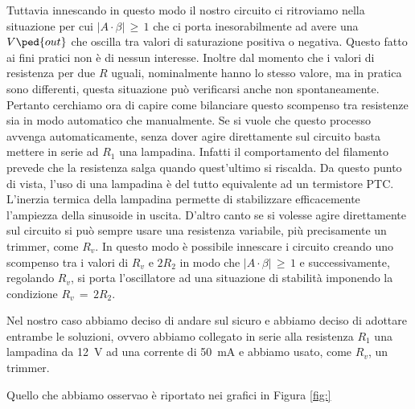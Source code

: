 Tuttavia innescando in questo modo il nostro circuito ci ritroviamo nella situazione per cui $\left|A \cdot \beta \right|\, \geq \,1$ che ci porta inesorabilmente ad avere una $V\ped{out}$ che oscilla tra valori di saturazione positiva o negativa. Questo fatto ai fini pratici non è di nessun interesse. Inoltre dal momento che i valori di resistenza per due $R$ uguali, nominalmente hanno lo stesso valore, ma in pratica sono differenti, questa situazione può verificarsi anche non spontaneamente.
Pertanto cerchiamo ora di capire come bilanciare questo scompenso tra resistenze sia in modo automatico che manualmente. Se si vuole che questo processo avvenga automaticamente, senza dover agire direttamente sul circuito basta mettere in serie ad $R_1$ una lampadina. Infatti il comportamento del filamento prevede che la resistenza salga quando quest'ultimo si riscalda. Da questo punto di vista, l'uso di una lampadina è del tutto equivalente ad un termistore PTC. L'inerzia termica della lampadina permette di stabilizzare efficacemente l'ampiezza della sinusoide in uscita.
D'altro canto se si volesse agire direttamente sul circuito si può sempre usare una resistenza variabile, più precisamente un trimmer, come $R_v$. In questo modo è possibile innescare i circuito creando uno scompenso tra i valori di $R_v$ e $2R_2$ in modo che $\left|A \cdot \beta \right|\, \geq \,1$ e successivamente, regolando $R_v$, si porta l'oscillatore ad una situazione di stabilità imponendo la condizione $R_v\,=\,2R_2$.

Nel nostro caso abbiamo deciso di andare sul sicuro e abbiamo deciso di adottare entrambe le soluzioni, ovvero abbiamo collegato in serie alla resistenza $R_1$ una lampadina da \SI{12}{\volt} ad una corrente di \SI{50}{\milli\ampere} e abbiamo usato, come $R_v$, un trimmer.

Quello che abbiamo osservao è riportato nei grafici in Figura \ref{fig:}


















